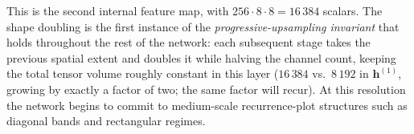 
This is the second internal feature map, with $256 \cdot 8 \cdot 8 =
16\,384$ scalars. The shape doubling is the first instance of the
\emph{progressive-upsampling invariant} that holds throughout the rest
of the network: each subsequent stage takes the previous spatial extent
and doubles it while halving the channel count, keeping the total tensor
volume roughly constant in this layer ($16\,384$ vs.\ $8\,192$ in
$\mathbf{h}^{(1)}$, growing by exactly a factor of two; the same factor
will recur). At this resolution the network begins to commit to
medium-scale recurrence-plot structures such as diagonal bands and
rectangular regimes.
